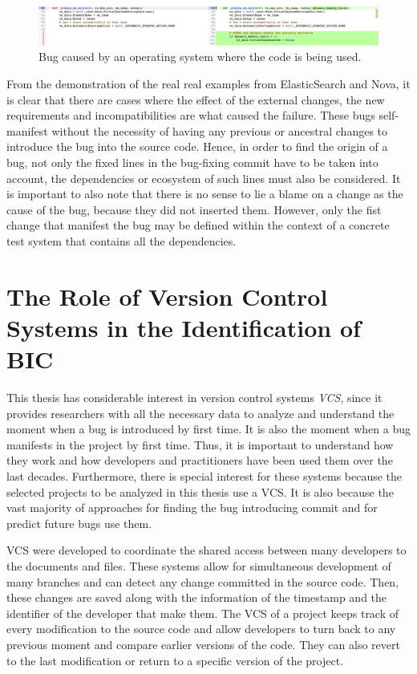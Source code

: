 \documentclass[a4paper, 12pt]{book}
\begin{document}
\begin{figure}[ht]
\centering
\includegraphics[width=\columnwidth]{img/windowsIssuefix.png}
\caption{Bug caused by an operating system where the code is being used.}
\label{fig:windowsissuefix}       %
\end{figure}

From the demonstration of the real real examples from ElasticSearch and Nova, it is clear that there are cases where  the effect of the external changes, the new requirements and incompatibilities are what caused the failure. These bugs self-manifest without the necessity of having any previous or ancestral changes to introduce the bug into the source code. Hence, in order to find the origin of a bug, not only the fixed lines in the bug-fixing commit  have to be taken into account, the dependencies or ecosystem of such lines must also be considered. It is important to also note that there is no sense to lie a blame on a change as the cause of the bug, because they did not inserted them. However, only the fist change that manifest the bug may be defined within the context of a concrete test system that contains all the dependencies.

\section{The Role of Version Control Systems in the Identification of BIC}
\label{subsec:VCS}

This thesis has considerable interest in version control systems \emph{VCS}, since it provides researchers with all the necessary data to analyze and understand the moment when a bug is introduced by first time. It is also the moment when a bug manifests in the project by first time. Thus, it is important to understand how they work and how developers and practitioners have been used them over the last decades. Furthermore, there is special interest for these systems because the selected projects to be analyzed in this thesis use a VCS. It is also because the vast majority of approaches for finding the bug introducing commit and for predict future bugs use them. 

VCS were developed to coordinate the shared access between many developers to the documents and files. These systems allow for simultaneous development of many branches and can detect any change committed in the source code. Then, these changes are saved along with the information of the timestamp and the identifier of the developer that make them. The VCS of a project keeps track of every modification to the source code and allow developers to turn back to any previous moment and compare earlier versions of the code. They can also revert to the last modification or return to a specific version of the project.
\end{document}
